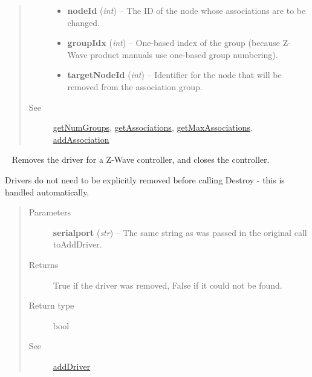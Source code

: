 \documentclass[letterpaper,10pt,english]{sphinxmanual}
\begin{document}
\begin{fulllineitems}
\begin{fulllineitems}
\begin{quote}
\begin{description}
\begin{itemize}
\item {} 
\textbf{nodeId} (\emph{int}) -- The ID of the node whose associations are to be changed.

\item {} 
\textbf{groupIdx} (\emph{int}) -- One-based index of the group (because Z-Wave product manuals use one-based group numbering).

\item {} 
\textbf{targetNodeId} (\emph{int}) -- Identifier for the node that will be removed from the association group.

\end{itemize}

\item[{See}] \leavevmode
{\hyperref[libopenzwave:getnumgroups]{getNumGroups}}, {\hyperref[libopenzwave:getassociations]{getAssociations}}, {\hyperref[libopenzwave:getmaxassociations]{getMaxAssociations}}, {\hyperref[libopenzwave:addassociation]{addAssociation}}

\end{description}\end{quote}

\end{fulllineitems}


\begin{fulllineitems}
\label{libopenzwave:libopenzwave.PyManager.removeDriver}~\label{libopenzwave:removedriver}
Removes the driver for a Z-Wave controller, and closes the controller.

Drivers do not need to be explicitly removed before calling Destroy - this is
handled automatically.
\begin{quote}\begin{description}
\item[{Parameters}] \leavevmode
\textbf{serialport} (\emph{str}) -- The same string as was passed in the original call toAddDriver.

\item[{Returns}] \leavevmode
True if the driver was removed, False if it could not be found.

\item[{Return type}] \leavevmode
bool

\item[{See}] \leavevmode
{\hyperref[libopenzwave:adddriver]{addDriver}}


\end{description}
\end{quote}
\end{fulllineitems}
\end{fulllineitems}
\end{document}
